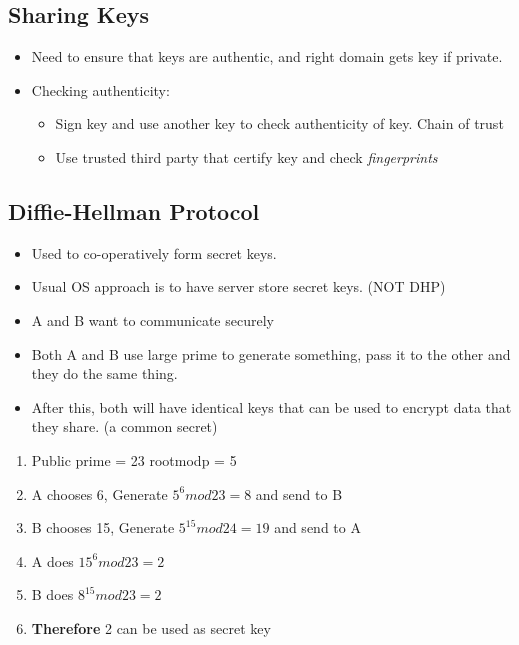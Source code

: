 \documentclass{article}
\newcommand\tab[1][0.5cm]{\hspace*{#1}}
\begin{document}
	\subsection{Sharing Keys}
		\begin{itemize}
			\item Need to ensure that keys are authentic, and right domain gets key if private.
			\item Checking authenticity:
			\begin{itemize}
				\item Sign key and use another key to check authenticity of key. Chain of trust
				\item Use trusted third party that certify key and check \textit{fingerprints}
			\end{itemize}
		\end{itemize}
		
	\subsection{Diffie-Hellman Protocol}
		\begin{itemize}
			\item Used to co-operatively form secret keys.
			\item Usual OS approach is to have server store secret keys. (NOT DHP)\\
			\item A and B want to communicate securely
			\item Both A and B use large prime to generate something, pass it to the other and they do the same thing. 
			\item After this, both will have identical keys that can be used to encrypt data that they share. (a common secret)
		\end{itemize}
		
		\begin{enumerate}
			\item Public prime = 23 \tab rootmodp = 5
			\item A chooses 6,  Generate $5^6 mod 23 = 8$ and send to B
			\item B chooses 15, Generate $5^{15} mod 24 = 19$ and send to A
			\item A does $15^{6} mod 23 = 2$
			\item B does $8^{15} mod 23 = 2$
			\item \textbf{Therefore} 2 can be used as secret key
		\end{enumerate}
	
\end{document}
